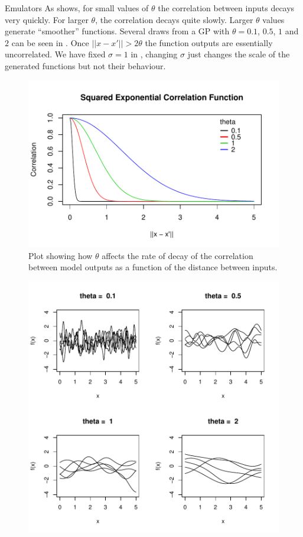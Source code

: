 \begin{chapter}{Emulators \label{Ch:Emulators}}
As  shows, for small values of $\theta$ the correlation between inputs decays very quickly. For larger $\theta$, the correlation decays quite slowly. Larger $\theta$ values generate ``smoother'' functions. Several draws from a GP with $\theta = 0.1$, $0.5$, $1$ and $2$ can be seen in . Once $||x - x'|| > 2\theta$ the function outputs are essentially uncorrelated. We have fixed $\sigma = 1$ in , changing $\sigma$ just changes the scale of the generated functions but not their behaviour.
\begin{figure}[h]
  \centering
  \includegraphics[width=\textwidth]{fig-emulators/squexp.pdf}
  \caption{Plot showing how $\theta$ affects the rate of decay of the correlation between model outputs as a function of the distance between inputs.}
  \label{Fig:sqexp}
\end{figure}
\begin{figure}[h]
  \centering
  \includegraphics[width=\textwidth]{fig-emulators/random-func.pdf}

\end{figure}
\end{chapter}
